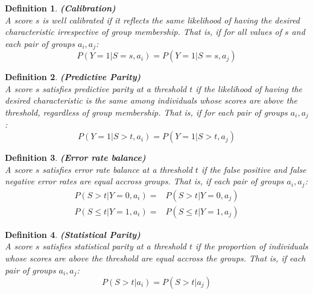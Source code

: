 \documentclass{article}
\newtheorem{definition}{Definition}
\begin{document}
\begin{definition}
  \textup{\textbf{ (Calibration) } \\
  A score $s$ is well calibrated if it reflects the same likelihood of having the desired characteristic irrespective of group membership. That is, if for all values of $s$ and each pair of groups $a_i, a_j$:  } 
  \[ P(Y=1|S=s, a_i) = P(Y=1|S=s, a_j) \] 
\end{definition}

  \begin{definition}
    \textup{\textbf{ (Predictive Parity) } \\
    A score $s$ satisfies \textit{predictive parity} at a threshold $t$ if the likelihood of having the desired characteristic is the same among individuals whose scores are above the threshold, regardless of group membership. That is, if for each pair of groups $a_i, a_j$:} 
    \[ P(Y=1|S > t, a_i) = P(Y=1|S > t, a_j) \] 
  \end{definition}

  \begin{definition}
      \textup{\textbf{ (Error rate balance) } \\
      A score $s$ satisfies \textit{error rate balance} at a threshold $t$ if the false positive and false negative error rates are equal accross groups. That is, if each pair of groups $a_i, a_j$:}\\
    \begin{align}
      P(S > t|Y=0, a_i) = & P(S > t|Y=0, a_j) \\
      P(S \leq t|Y=1, a_i) = & P(S \leq t|Y=1, a_j)
    \end{align}
 \end{definition}


 \begin{definition}
  \textup{\textbf{ (Statistical Parity) } \\
  A score $s$ satisfies \textit{statistical parity} at a threshold $t$ if the proportion of individuals whose scores are above the threshold are equal accross the groups. That is, if each pair of groups $a_i, a_j$:}\\
\[   P(S > t| a_i) = P(S > t|a_j) \] 
\end{definition}
\end{document}
